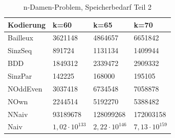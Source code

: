\documentclass[a4,abstract=on]{scrartcl}
\begin{document}
\begin{landscape}
\begin{table}[h!]
    \small
    \setlength{\tabcolsep}{0.11cm}
     \centering
     \begin{tabular}[width=\textwidth]{|l||l|l|l|}
	\hline
       \textbf{Kodierung}  & \textbf{k=60} &\textbf{k=65} &\textbf{k=70}\\
	\hline
	\hline
	Bailleux & 3621148 & 4864657 & 6651842\\
\hline
	SinzSeq & 891724 & 1131134 & 1409944 \\
\hline
	BDD & 1849312 & 2339472 & 2909332\\
\hline
	SinzPar & 142225 & 168000 & 195105 \\
\hline
	NOddEven & 3037418 & 6734548 & 7058878\\
\hline
	NOwn & 2244514 & 5192270 & 5388482\\
 \hline
	NNaiv & 93189678 & 128099268 & 172003158\\
\hline
	Naiv &  $1,02 \cdot 10^{133}$ &  $2,22 \cdot 10^{146}$ &  $7,13 \cdot 10^{159}$\\
\hline
       
     \end{tabular}

     \caption{n-Damen-Problem, Speicherbedarf Teil 2}
     \label{tbl:beispieltabelle}



\end{table}
\end{landscape}
\end{document}
